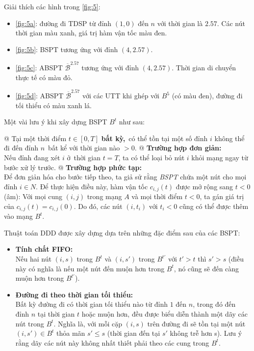 \documentclass[../main.tex]{subfiles}
\begin{document}
\newpage
Giải thích các hình trong \autoref{fig:5}: 
\begin{itemize}
  \item \autoref{fig:5a}: đường đi TDSP từ đỉnh \((1, 0)\) đến \(n\) với thời gian là \(2.57\). 
  Các nút thời gian màu xanh, giá trị hàm vận tốc màu đen.
  \item \autoref{fig:5b}: BSPT tương ứng với đỉnh \((4, 2.57)\).
  \item \autoref{fig:5c}: ABSPT \(\overline{\mathcal{B}}^{2.57}\) tương ứng với đỉnh \((4, 2.57)\). 
  Thời gian di chuyển thực tế có màu đỏ.
  \item \autoref{fig:5d}: ABSPT \(\overline{\mathcal{B}}^{2.57}\) với các UTT khi ghép với \(B^5\) (có màu đen),
  đường đi tối thiểu có màu xanh lá.
\end{itemize}

Một vài lưu ý khi xây dựng BSPT \(B^t\) như sau:

\begin{easylist}[itemize]

  @ Tại một thời điểm \(t \in [0, T]\) \textbf{bất kỳ,}~có thể tồn tại một
  số đỉnh \(i\) không thể đi đến đỉnh \(n\)~bất kể với thời gian nào
  \(> 0\).
  @ \textbf{Trường hợp đơn giản:}\\
  Nếu đỉnh đang xét \(i\) ở~thời gian
  \(t = T\), ta có thể loại bỏ nút \(i\) khỏi mạng ngay từ bước xử lý
  trước.
  @ \textbf{Trường hợp phức tạp:}\\
  Để đơn giản hóa cho bước tiếp theo, ta
  giả sử rằng \emph{BSPT} chứa một nút cho mọi đỉnh \(i \in N\). Để thực
  hiện điều này, hàm vận tốc \(c_{i,j}(t)\) được mở rộng
  sang \(t < 0\) (âm): Với mọi cung \((i, j)\) trong mạng \(A\) và mọi
  thời điểm \(t < 0\), ta gán giá trị của \(c_{i,j}(t) = c_{i,j}(0)\).
  Do đó, các nút \((i, t_i)\) với \(t_i<0\) cũng có thể được thêm vào
  mạng \(B^t\).
\end{easylist}

Thuật toán DDD được xây dựng dựa trên những đặc điểm sau của các BSPT: 
\begin{itemize}
  \tightlist
  \item
    \textbf{Tính chất FIFO:}\\ 
    Nếu hai nút \((i, s)\) trong \(B^t\) và
    \((i, s')\) trong \(B^{t'}\) với \(t' > t\) thì \(s' > s\) (điều này
    có nghĩa là nếu một nút đến muộn hơn trong \(B^t\), nó cũng sẽ đến
    càng muộn hơn trong \(B^{t'}\)).
  \item
    \textbf{Đường đi theo thời gian tối thiểu:} \\
    Bất kỳ đường đi có thời
    gian tối thiểu nào từ đỉnh \(1\) đến \(n\), trong đó đến đỉnh \(n\)
    tại thời gian \(t\) hoặc muộn hơn, đều được biểu diễn thành một dãy
    các nút trong \(B^t\). Nghĩa là, với mỗi cặp \((i, s)\) trên đường đi
    sẽ tồn tại một nút \((i, s') \in B^t\) thỏa mãn \(s' \le s\) (thời
    gian đến tại \(s'\) không trễ hơn s). Lưu ý rằng dãy các nút này không
    nhất thiết phải theo các cung trong \(B^t\).
  \end{itemize}
\end{document}
